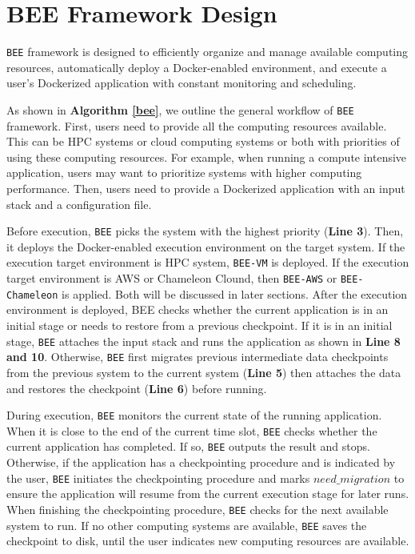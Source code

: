 \section{BEE Framework Design}
\texttt{BEE} framework is designed to efficiently organize and manage available computing resources, automatically deploy a Docker-enabled environment, and execute a user's Dockerized application with constant monitoring and scheduling. 

As shown in \textbf{Algorithm \ref{bee}}, we outline the general workflow of \texttt{BEE} framework. First, users need to provide all the computing resources available. This can be HPC systems or cloud computing systems or both with priorities of using these computing resources. For example, when running a compute intensive application, users may want to prioritize systems with higher computing performance. Then, users need to provide a Dockerized application with an input stack and a configuration file.

Before execution, \texttt{BEE} picks the system with the highest priority (\textbf{Line 3}). Then, it deploys the Docker-enabled execution environment on the target system. If the execution target environment is HPC system, \texttt{BEE-VM} is deployed. If the execution target environment is AWS or Chameleon Clound, then \texttt{BEE-AWS} or \texttt{BEE-Chameleon} is applied. Both will be discussed in later sections. After the execution environment is deployed, BEE checks whether the current application is in an initial stage or needs to restore from a previous checkpoint. If it is in an initial stage, \texttt{BEE} attaches the input stack and runs the application as shown in \textbf{Line 8 and 10}. Otherwise, \texttt{BEE} first migrates previous intermediate data checkpoints from the previous system to the current system (\textbf{Line 5}) then attaches the data and restores the checkpoint (\textbf{Line 6}) before running. 

During execution, \texttt{BEE} monitors the current state of the running application. When it is close to the end of the current time slot, \texttt{BEE} checks whether the current application has completed. If so, \texttt{BEE} outputs the result and stops. Otherwise, if the application has a checkpointing procedure and is indicated by the user, \texttt{BEE} initiates the checkpointing procedure and marks $need\_migration$ to ensure the application will resume from the current execution stage for later runs. When finishing the checkpointing procedure, \texttt{BEE} checks for the next available system to run. If no other computing systems are available, \texttt{BEE} saves the checkpoint to disk, until the user indicates new computing resources are available.
	

